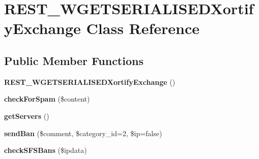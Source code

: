 \hypertarget{class_r_e_s_t___w_g_e_t_s_e_r_i_a_l_i_s_e_d_xortify_exchange}{\section{R\-E\-S\-T\-\_\-\-W\-G\-E\-T\-S\-E\-R\-I\-A\-L\-I\-S\-E\-D\-Xortify\-Exchange Class Reference}
\label{class_r_e_s_t___w_g_e_t_s_e_r_i_a_l_i_s_e_d_xortify_exchange}
}
\subsection*{Public Member Functions}
\begin{DoxyCompactItemize}
\item 
\hypertarget{class_r_e_s_t___w_g_e_t_s_e_r_i_a_l_i_s_e_d_xortify_exchange_aa2e56e4630853297f1f4f220b93b797c}{{\bfseries R\-E\-S\-T\-\_\-\-W\-G\-E\-T\-S\-E\-R\-I\-A\-L\-I\-S\-E\-D\-Xortify\-Exchange} ()}\label{class_r_e_s_t___w_g_e_t_s_e_r_i_a_l_i_s_e_d_xortify_exchange_aa2e56e4630853297f1f4f220b93b797c}

\item 
\hypertarget{class_r_e_s_t___w_g_e_t_s_e_r_i_a_l_i_s_e_d_xortify_exchange_a7a4f53c3841dc7806455261af557d514}{{\bfseries check\-For\-Spam} (\$content)}\label{class_r_e_s_t___w_g_e_t_s_e_r_i_a_l_i_s_e_d_xortify_exchange_a7a4f53c3841dc7806455261af557d514}

\item 
\hypertarget{class_r_e_s_t___w_g_e_t_s_e_r_i_a_l_i_s_e_d_xortify_exchange_a882f365bc81e207dc2123ef707735e82}{{\bfseries get\-Servers} ()}\label{class_r_e_s_t___w_g_e_t_s_e_r_i_a_l_i_s_e_d_xortify_exchange_a882f365bc81e207dc2123ef707735e82}

\item 
\hypertarget{class_r_e_s_t___w_g_e_t_s_e_r_i_a_l_i_s_e_d_xortify_exchange_a0293acfa4afe0cb5b2816352a35d8ca7}{{\bfseries send\-Ban} (\$comment, \$category\-\_\-id=2, \$ip=false)}\label{class_r_e_s_t___w_g_e_t_s_e_r_i_a_l_i_s_e_d_xortify_exchange_a0293acfa4afe0cb5b2816352a35d8ca7}

\item 
\hypertarget{class_r_e_s_t___w_g_e_t_s_e_r_i_a_l_i_s_e_d_xortify_exchange_a985a563a84e3e5c54694fcce192bda53}{{\bfseries check\-S\-F\-S\-Bans} (\$ipdata)}\label{class_r_e_s_t___w_g_e_t_s_e_r_i_a_l_i_s_e_d_xortify_exchange_a985a563a84e3e5c54694fcce192bda53}


\end{DoxyCompactItemize}
